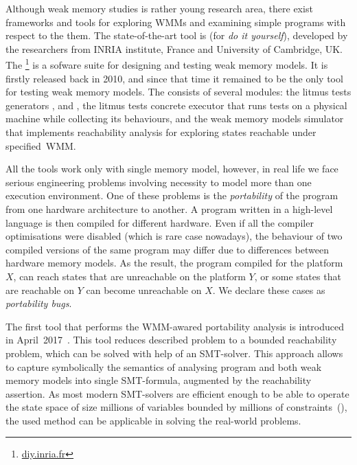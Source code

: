 Although weak memory studies is rather young research area, there exist frameworks and tools for exploring WMMs and examining simple programs with respect to the them. The state-of-the-art tool is  (for \textit{do it yourself}), developed by the researchers from INRIA institute, France and University of Cambridge, UK.
The \footnote{\url{diy.inria.fr}} is a sofware suite for designing and testing weak memory models. It is firstly released back in 2010, and since that time it remained to be the only tool for testing weak memory models. The  consists of several modules: the litmus tests generators ,  and , the litmus tests concrete executor  that runs tests on a physical machine while collecting its behaviours, and the weak memory models simulator  that implements reachability analysis for exploring states reachable under specified~WMM.

All the  tools work only with single memory model, however, in real life we face serious engineering problems involving necessity to model more than one execution environment. One of these problems is the \textit{portability} of the program from one hardware architecture to another. A program written in a high-level language is then compiled for different hardware. Even if all the compiler optimisations were disabled (which is rare case nowadays), the behaviour of two compiled versions of the same program may differ due to differences between hardware memory models. As the result, the program compiled for the platform $X$, can reach states that are unreachable on the platform $Y$, or some states that are reachable on $Y$ can become unreachable on $X$. We declare these cases as \textit{portability bugs}.

The first tool that performs the WMM-awared portability analysis is  introduced in April~2017~\cite{Porthos17}. This tool reduces described problem to a bounded reachability problem, which can be solved with help of an SMT-solver. This approach allows to capture symbolically the semantics of analysing program and both weak memory models into single SMT-formula, augmented by the reachability assertion. As most modern SMT-solvers are efficient enough to be able to operate the state space of size millions of variables bounded by millions of constraints~(\cite{malik2009boolean}), the used method can be applicable in solving the real-world problems.

